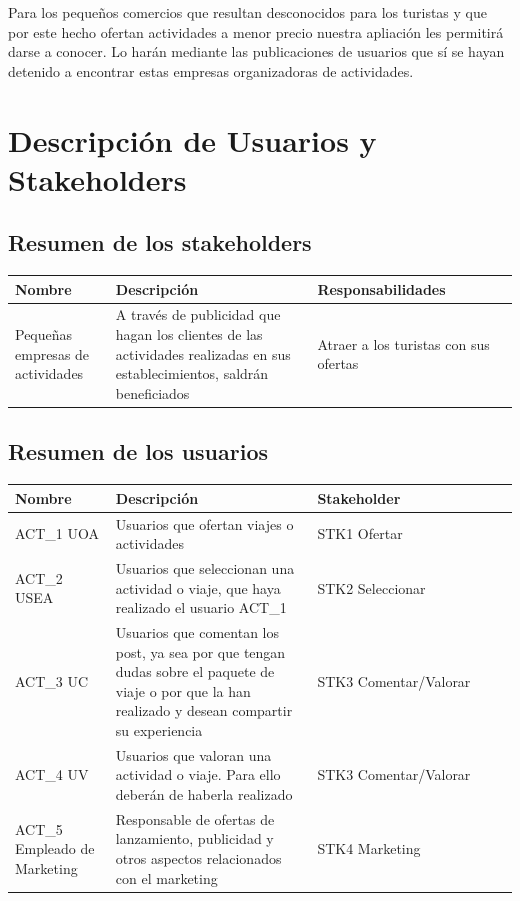 \documentclass[11pt]{article}
\begin{document}
Para los pequeños comercios que resultan desconocidos para los turistas y que por este hecho ofertan actividades a menor precio nuestra apliación les permitirá darse a conocer. Lo harán mediante las publicaciones de usuarios que sí se hayan detenido a encontrar estas empresas organizadoras de actividades.
\newpage

\section{Descripción de Usuarios y Stakeholders}

\subsection{Resumen de los stakeholders}
\begin{table}[H]
  \centering
  \begin{tabular}{p{0.2\linewidth}p{0.4\linewidth}p{0.4\linewidth}}
    \toprule
    \textbf{Nombre} & \textbf{Descripción} & \textbf{Responsabilidades} \\
    \midrule
    Pequeñas empresas de actividades & A través de publicidad que hagan los clientes de las actividades realizadas en sus establecimientos, saldrán beneficiados & Atraer a los turistas con sus ofertas\\
    \bottomrule
  \end{tabular}
\end{table}

\subsection{Resumen de los usuarios}
\begin{table}[H]
  \centering
  \begin{tabular}{p{0.2\linewidth}p{0.4\linewidth}p{0.4\linewidth}}
    \toprule
    \textbf{Nombre} & \textbf{Descripción} & \textbf{Stakeholder} \\
    \midrule
    ACT\_1 UOA & Usuarios que ofertan viajes o actividades & STK1 Ofertar\\
    ACT\_2 USEA & Usuarios que seleccionan una actividad o viaje, que haya realizado el usuario ACT\_1 & STK2 Seleccionar\\
    ACT\_3 UC & Usuarios que comentan los post, ya sea por que tengan dudas sobre el paquete de viaje o por que la han realizado y desean compartir su experiencia & STK3 Comentar/Valorar\\
    ACT\_4 UV & Usuarios que valoran una actividad o viaje. Para ello deberán de haberla realizado & STK3 Comentar/Valorar\\
    ACT\_5  Empleado de Marketing & Responsable de ofertas de lanzamiento, publicidad y otros aspectos relacionados con el marketing & STK4 Marketing\\
    \bottomrule
  \end{tabular}
\end{table}
\end{document}
